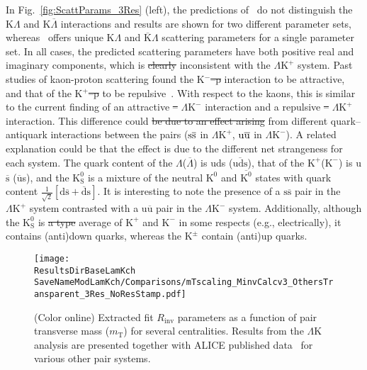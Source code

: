\documentclass[ALICE,manyauthors]{cernphprep}
\newcommand{\ResultsDirBaseLamKch}{/home/jesse/Analysis/FemtoAnalysis/Results/Results_cLamcKch_20190319/}
\newcommand{\MomRes}{_MomResCrctn}%
\newcommand{\NonFlatBgdLamKch}{_NonFlatBgdCrctnLamK0LamKchPolynomial}
\newcommand{\ResNum}{_3Res}
\newcommand{\PrimMaxDecay}{_PrimMaxDecay10fm}
\newcommand{\ResMethod}{_UsingXiDataAndCoulombOnly}
\newcommand{\ParamFixAndShareLamKch}{_ShareLam_Dualie_ShareLam_ShareRadii}
\newcommand{\SaveNameModLamKch}{\MomRes\NonFlatBgdLamKch\ResNum\PrimMaxDecay\ResMethod\ParamFixAndShareLamKch}
\newcommand{\mt}{$m_{\mathrm{T}}$\xspace}
\newcommand{\Lam}{$\Lambda$\xspace}
\newcommand{\ALam}{$\overline{\Lambda}$\xspace}
\newcommand{\KchP}{$\mathrm{K^{+}}$\xspace}
\newcommand{\KchM}{$\mathrm{K^{-}}$\xspace}
\newcommand{\Kpm}{$\mathrm{K^{\pm}}$\xspace}
\newcommand{\Ks}{$\mathrm{K^{0}_{S}}$\xspace}
\newcommand{\LamK}{$\Lambda$K\xspace}
\newcommand{\LamKchP}{$\Lambda\mathrm{K^{+}}$\xspace}
\newcommand{\LamKchM}{$\Lambda\mathrm{K^{-}}$\xspace}
\providecommand{\DIFaddtex}[1]{{\protect\color{blue}\uwave{#1}}} %
\providecommand{\DIFdeltex}[1]{{\protect\color{red}\sout{#1}}}                      %
\providecommand{\DIFaddbegin}{} %
\providecommand{\DIFaddend}{} %
\providecommand{\DIFdelbegin}{} %
\providecommand{\DIFdelend}{} %
\providecommand{\DIFaddbeginFL}{} %
\providecommand{\DIFaddendFL}{} %
\providecommand{\DIFdelbeginFL}{} %
\providecommand{\DIFdelendFL}{} %
\providecommand{\DIFadd}[1]{\texorpdfstring{\DIFaddtex{#1}}{#1}} %
\providecommand{\DIFdel}[1]{\texorpdfstring{\DIFdeltex{#1}}{}} %
\begin{document}
In Fig.~\ref{fig:ScattParams_3Res} (left), the predictions of~\cite{Liu:2006xja} do not distinguish the K\Lam and K\ALam interactions and results are shown for two different parameter sets, whereas~\cite{Mai:2009ce} offers unique K\Lam and $\overline{\mathrm{K}}$\Lam scattering parameters for a single parameter set. 
In all cases, the predicted scattering parameters have both positive real and imaginary components, which is \DIFdelbegin \DIFdel{clearly }\DIFdelend inconsistent with the \LamKchP system.
Past studies of kaon-proton scattering found the K$^{-}$\DIFdelbegin \DIFdel{--p }\DIFdelend \DIFaddbegin \DIFadd{p }\DIFaddend interaction to be attractive, and that of the K$^{+}$\DIFdelbegin \DIFdel{--p }\DIFdelend \DIFaddbegin \DIFadd{p }\DIFaddend to be repulsive~\cite{Humphrey:1962zz, Hadjimichef:2002xe, Ikeda:2012au}.
With respect to the kaons, this is similar to the current finding of an attractive \DIFdelbegin %
\DIFdel{--}%
\DIFdelend \DIFaddbegin \LamKchM \DIFaddend interaction and a repulsive \DIFdelbegin %
\DIFdel{--}%
\DIFdelend \DIFaddbegin \LamKchP \DIFaddend interaction.
This difference could \DIFdelbegin \DIFdel{be due to an effect arising }\DIFdelend \DIFaddbegin \DIFadd{arise }\DIFaddend from different quark--antiquark interactions between the pairs ($\rm s\overline{s}$ in \LamKchP, $\rm u\overline{u}$ in \LamKchM).
A related explanation could be that the effect is due to the different net strangeness for each system.
The quark content of the \Lam (\ALam) is uds ($\overline{\mathrm{uds}}$), that of the \KchP (\KchM) is u$\overline{\mathrm{s}}$ ($\overline{\mathrm{u}}$s), and the \Ks is a mixture of the neutral $\mathrm{K}^{0}$ and $\overline{\mathrm{K}^{0}}$ states with quark content $\frac{1}{\sqrt{2}}\left[\mathrm{d\overline{s} + \overline{d}s}\right]$.
It is interesting to note the presence of a $\mathrm{s\overline{s}}$ pair in the \LamKchP system contrasted with a $\mathrm{u\overline{u}}$ pair in the \LamKchM system.
Additionally, although the \Ks is \DIFdelbegin \DIFdel{a type }\DIFdelend \DIFaddbegin \DIFadd{an }\DIFaddend average of \KchP and \KchM in some respects (e.g., electrically), it contains (anti)down quarks, whereas the \Kpm contain (anti)up quarks.

\begin{figure}[h]
  \centering
  \DIFdelbeginFL %
\DIFdelendFL \DIFaddbeginFL \texttt{[image: \\ResultsDirBaseLamKch\\SaveNameModLamKch/Comparisons/mTscaling\_MinvCalcv3\_OthersTransparent\_3Res\_NoResStamp.pdf]}
  \DIFaddendFL \caption[\mt Scaling of Radii: 3 Residuals in Fit]
  {
  (Color online) Extracted fit $R_{\mathrm{inv}}$ parameters as a function of pair transverse mass (\mt) for several centralities.
  Results from the \LamK analysis are presented together with ALICE published data~\cite{Adam:2015vja} for various other pair systems.  
  }
  \label{fig:mTScalingOfRadii_3Res}
\end{figure}
\end{document}
